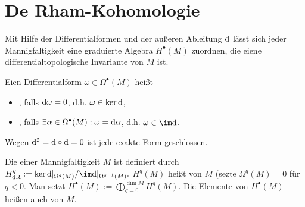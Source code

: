 

\section{De Rham-Kohomologie}

Mit Hilfe der Differentialformen und der außeren Ableitung $\mathrm{d}$ lässt sich jeder Mannigfaltigkeit eine graduierte Algebra $H^\bullet(M)$ zuordnen, die eiene differentialtopologische Invariante von $M$ ist.


\begin{df}
    Eien Differentialform $\omega \in \Omega^\bullet(M)$ heißt
    \begin{itemize}
        \item
            , falls $\mathrm{d} \omega = 0$, d.h. $\omega \in \ker \mathrm{d}$,
        \item
            , falls $\exists \alpha \in \Omega^\bullet(M): \omega = \mathrm{d} \alpha$, d.h. $\omega \in \im \d$.
    \end{itemize}
    Wegen $\mathrm{d}^2 = \mathrm{d} \circ \mathrm{d} = 0$ ist jede exakte Form geschlossen.

    Die  einer Mannigfaltigkeit $M$ ist definiert durch
    \begin{math}
        H_{\dR}^q := \ker \d|_{\Omega^q(M)} / \im \d|_{\Omega^{q-1}(M)}.
    \end{math}
    $H^q(M)$ heißt  von $M$ (sezte $\Omega^q(M) = 0$ für $q < 0$.
    Man setzt
    \begin{math}
        H^\bullet(M) := \bigoplus_{q=0}^{\dim M} H^q(M).
    \end{math}
    Die Elemente von $H^\bullet(M)$ heißen auch  von $M$.
\end{df}

